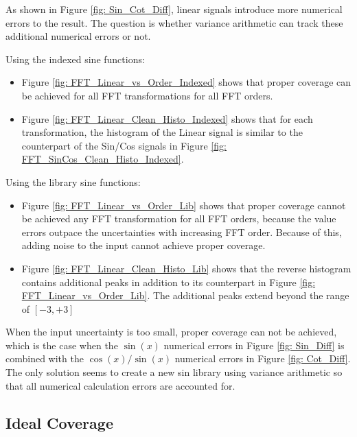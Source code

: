 \documentclass[twoside]{article}
\numberwithin{equation}{section}
\begin{document}
As shown in Figure \ref{fig: Sin_Cot_Diff}, linear signals introduce more numerical errors to the result.
The question is whether variance arithmetic can track these additional numerical errors or not.

Using the indexed sine functions:
\begin{itemize}
\item Figure \ref{fig: FFT_Linear_vs_Order_Indexed} shows that proper coverage can be achieved for all FFT transformations for all FFT orders.

\item Figure \ref{fig: FFT_Linear_Clean_Histo_Indexed} shows that for each transformation, the histogram of the Linear signal is similar to the counterpart of the Sin/Cos signals in Figure \ref{fig: FFT_SinCos_Clean_Histo_Indexed}. 

\end{itemize}
 
Using the library sine functions:
\begin{itemize}
\item Figure \ref{fig: FFT_Linear_vs_Order_Lib} shows that proper coverage cannot be achieved any FFT transformation for all FFT orders, because the value errors outpace the uncertainties with increasing FFT order.
Because of this, adding noise to the input cannot achieve proper coverage.

\item Figure \ref{fig: FFT_Linear_Clean_Histo_Lib} shows that the reverse histogram contains additional peaks in addition to its counterpart in Figure \ref{fig: FFT_Linear_vs_Order_Lib}.
The additional peaks extend beyond the range of $[-3, +3]$

\end{itemize}

When the input uncertainty is too small, proper coverage can not be achieved, which is the case when the $\sin(x)$ numerical errors in Figure \ref{fig: Sin_Diff} is combined with the $\cos(x)/\sin(x)$ numerical errors in Figure \ref{fig: Cot_Diff}.
The only solution seems to create a new sin library using variance arithmetic so that all numerical calculation errors are accounted for.



\subsection{Ideal Coverage}
\end{document}
